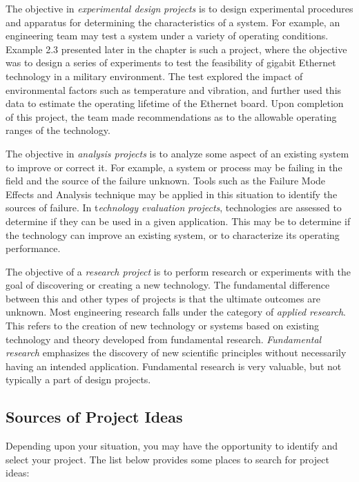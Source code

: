 The objective in \emph{experimental design} \emph{projects} is to design
experimental procedures and apparatus for determining the
characteristics of a system. For example, an engineering team may test a
system under a variety of operating conditions. Example 2.3 presented
later in the chapter is such a project, where the objective was to
design a series of experiments to test the feasibility of gigabit
Ethernet technology in a military environment. The test explored the
impact of environmental factors such as temperature and vibration, and
further used this data to estimate the operating lifetime of the
Ethernet board. Upon completion of this project, the team made
recommendations as to the allowable operating ranges of the technology.

The objective in \emph{analysis projects} is to analyze some aspect of
an existing system to improve or correct it. For example, a system or
process may be failing in the field and the source of the failure
unknown. Tools such as the Failure Mode Effects and Analysis technique
may be applied in this situation to identify the sources of failure. In
t\emph{echnology evaluation} \emph{projects}, technologies are assessed
to determine if they can be used in a given application. This may be to
determine if the technology can improve an existing system, or to
characterize its operating performance.

The objective of a \emph{research project} is to perform research or
experiments with the goal of discovering or creating a new technology.
The fundamental difference between this and other types of projects is
that the ultimate outcomes are unknown. Most engineering research falls
under the category of \emph{applied research}. This refers to the
creation of new technology or systems based on existing technology and
theory developed from fundamental research. \emph{Fundamental research}
emphasizes the discovery of new scientific principles without
necessarily having an intended application. Fundamental research is very
valuable, but not typically a part of design projects.

\subsection{Sources of Project Ideas}\label{sources-of-project-ideas}

Depending upon your situation, you may have the opportunity to identify
and select your project. The list below provides some places to search
for project ideas:

